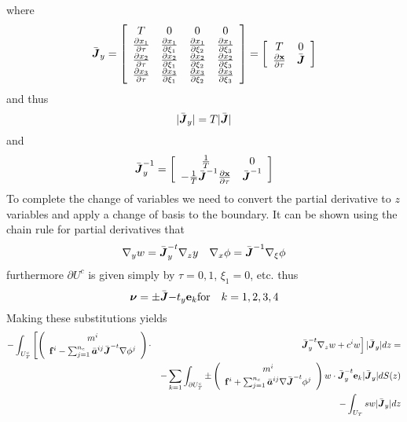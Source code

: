 \documentclass[10pt,dvips,twoside,reqno]{amsart}
\begin{document}
where 
\begin{equation}
  \label{eq:jacobian}
  \bar{\mbox{{\boldmath ${J}$}}}_y = \left[ \begin{array}{cccc}
T  & 0 & 0 & 0 \\
\frac{\partial {x_1}}{\partial {\tau}} & \frac{\partial {x_1}}{\partial {\xi_1}} &  \frac{\partial {x_1}}{\partial {\xi_2}} &  \frac{\partial {x_1}}{\partial {\xi_3}} \\
\frac{\partial {x_2}}{\partial {\tau}} & \frac{\partial {x_2}}{\partial {\xi_1}} &  \frac{\partial {x_2}}{\partial {\xi_2}} &  \frac{\partial {x_2}}{\partial {\xi_3}} \\
\frac{\partial {x_3}}{\partial {\tau}} & \frac{\partial {x_3}}{\partial {\xi_1}} &  \frac{\partial {x_3}}{\partial {\xi_2}} &  \frac{\partial {x_3}}{\partial {\xi_3}} 
\end{array} \right] = \left[ \begin{array}{cc} T & 0 \\
 \frac{\partial {{\bf x}}}{\partial {\tau}} & \bar{\mbox{{\boldmath ${J}$}}} \end{array} \right]
\end{equation}
and thus
\begin{equation}
|\bar{\mbox{{\boldmath ${J}$}}}_y| = T |\bar{\mbox{{\boldmath ${J}$}}}|
\end{equation}
and 
\begin{equation}
  \label{eq:jacobianInv}
  \bar{\mbox{{\boldmath ${J}$}}}_y^{-1} = \left[ \begin{array}{cc} \frac{1}{T} & 0 \\
- \frac{1}{T}\bar{\mbox{{\boldmath ${J}$}}}^{-1}\frac{\partial {{\bf x}}}{\partial {\tau}} & \bar{\mbox{{\boldmath ${J}$}}}^{-1}
\end{array}\right]
\end{equation}
To complete the change of variables we need to convert the partial
derivative to $z$ variables and apply a change of basis to the
boundary. It can be shown using the chain rule for partial derivatives
that
\begin{equation}
\nabla_y w = \bar{\mbox{{\boldmath ${J}$}}}^{-t}_y \nabla_z y \quad \nabla_x \phi = \bar{\mbox{{\boldmath ${J}$}}}^{-1} \nabla_{\xi} \phi
\end{equation}
furthermore $\partial U^c$ is given simply by $\tau = 0,1$, $\xi_1 = 0$, etc. thus
\begin{equation}
\mbox{{\boldmath ${\nu}$}} = \pm \bar{\mbox{{\boldmath ${J}$}}}{-t}_y {\bf e}_k \mbox{for}\quad k=1,2,3,4
\end{equation}
Making these substitutions yields
\begin{eqnarray}
-\int_{U^c_T} \left[ \left(  \begin{array}{c} m^i \\ {\bf f}^i - \sum_{j=1}^{n_c} \bar{\mbox{{\boldmath ${a}$}}}^{ij}  \bar{\mbox{{\boldmath ${J}$}}}^{-t} \nabla \phi^j \end{array} \right) \right. &\cdot& \left. \bar{\mbox{{\boldmath ${J}$}}}^{-t}_y \nabla_z w + c^i w \right] |\bar{\mbox{{\boldmath ${J}$}}}_y| dz = \\
&& -\sum_{k=1} \int_{\partial U^c_T} \pm \left(  \begin{array}{c} m^i \\{\bf f}^i + \sum_{j=1}^{n_c} \bar{\mbox{{\boldmath ${a}$}}}^{ij} \nabla \bar{\mbox{{\boldmath ${J}$}}}^{-t}\phi^j \end{array} \right) w \cdot \bar{\mbox{{\boldmath ${J}$}}}^{-t}_y {\bf e}_k |\bar{\mbox{{\boldmath ${J}$}}}_y| dS(z) \nonumber \\
&& -  \int_{U_T} sw |\bar{\mbox{{\boldmath ${J}$}}}_y| dz
\end{eqnarray}
\end{document}
